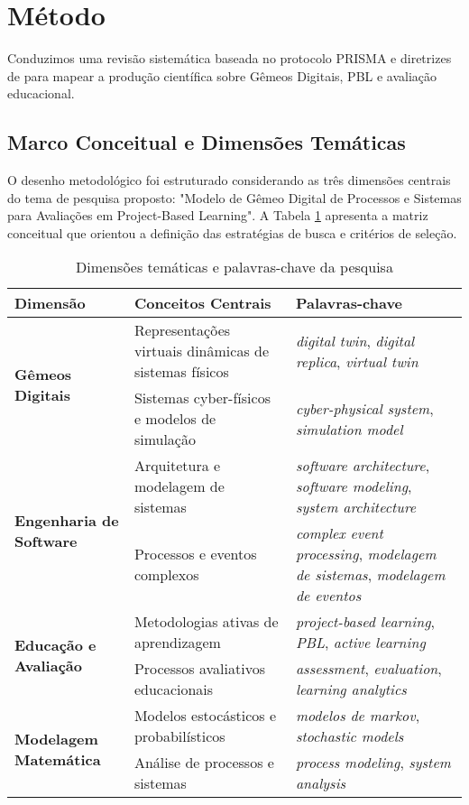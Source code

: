 \documentclass[english, spanish, brazilian]{RBIEarticle} %
\begin{document}
\section{Método}

Conduzimos uma revisão sistemática baseada no protocolo PRISMA \parencite{Page2021} e diretrizes de \textcite{Kitchenham2007} para mapear a produção científica sobre Gêmeos Digitais, PBL e avaliação educacional.

\subsection{Marco Conceitual e Dimensões Temáticas}

O desenho metodológico foi estruturado considerando as três dimensões centrais do tema de pesquisa proposto: "Modelo de Gêmeo Digital de Processos e Sistemas para Avaliações em Project-Based Learning". A Tabela \ref{tab:dimensoes} apresenta a matriz conceitual que orientou a definição das estratégias de busca e critérios de seleção.

\begin{table}[htbp]
\centering
\caption{Dimensões temáticas e palavras-chave da pesquisa}
\label{tab:dimensoes}
\begin{tabularx}{\textwidth}{lXX}
\toprule
\textbf{Dimensão} & \textbf{Conceitos Centrais} & \textbf{Palavras-chave} \\
\midrule
\multirow{2}{*}{\textbf{Gêmeos Digitais}} 
& Representações virtuais dinâmicas de sistemas físicos & \textit{digital twin}, \textit{digital replica}, \textit{virtual twin} \\
& Sistemas cyber-físicos e modelos de simulação & \textit{cyber-physical system}, \textit{simulation model} \\
\cmidrule{2-3}
\multirow{2}{*}{\textbf{Engenharia de Software}}
& Arquitetura e modelagem de sistemas & \textit{software architecture}, \textit{software modeling}, \textit{system architecture} \\
& Processos e eventos complexos & \textit{complex event processing}, \textit{modelagem de sistemas}, \textit{modelagem de eventos} \\
\cmidrule{2-3}
\multirow{2}{*}{\textbf{Educação e Avaliação}}
& Metodologias ativas de aprendizagem & \textit{project-based learning}, \textit{PBL}, \textit{active learning} \\
& Processos avaliativos educacionais & \textit{assessment}, \textit{evaluation}, \textit{learning analytics} \\
\cmidrule{2-3}
\multirow{2}{*}{\textbf{Modelagem Matemática}}
& Modelos estocásticos e probabilísticos & \textit{modelos de markov}, \textit{stochastic models} \\
& Análise de processos e sistemas & \textit{process modeling}, \textit{system analysis} \\
\bottomrule
\end{tabularx}
\end{table}
\end{document}
